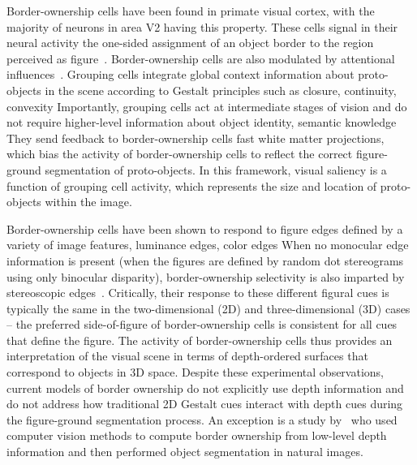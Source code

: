 Border-ownership cells have been found in primate visual cortex, with the majority of neurons in area V2 having this property. These cells signal in their neural activity the one-sided assignment of an object border to the region perceived as figure~\citep{Zhou_etal00}. Border-ownership cells are also modulated by attentional influences~\citep{Qiu_etal07}. Grouping cells integrate global context information about proto-objects in the scene according to Gestalt principles such as closure, continuity, convexity \etc Importantly, grouping cells act at intermediate stages of vision and do not require higher-level information about object identity, semantic knowledge \etc They send feedback to border-ownership cells \via fast white matter projections, which bias the activity of border-ownership cells to reflect the correct figure-ground segmentation of proto-objects. In this framework, visual saliency is a function of grouping cell activity, which represents the size and location of proto-objects within the image.

Border-ownership cells have been shown to respond to figure edges defined by a variety of image features, \eg luminance edges, color edges \etc When no monocular edge information is present (\ie when the figures are defined by random dot stereograms using only binocular disparity), border-ownership selectivity is also imparted by stereoscopic edges~\citep{Qiu_vonderHeydt05}. Critically, their response to these different figural cues is typically the same in the two-dimensional (2D) and three-dimensional (3D) cases -- the preferred side-of-figure of border-ownership cells is consistent for all cues that define the figure. The activity of border-ownership cells thus provides an interpretation of the visual scene in terms of depth-ordered surfaces that correspond to objects in 3D space.
%
%
Despite these experimental observations, current models of border ownership do not explicitly use depth information and do not address how traditional 2D Gestalt cues interact with depth cues during the figure-ground segmentation process. An exception is a study by~\cite{Mishra_etal12} who used computer vision methods to compute border ownership from low-level depth information and then performed object segmentation in natural images.

